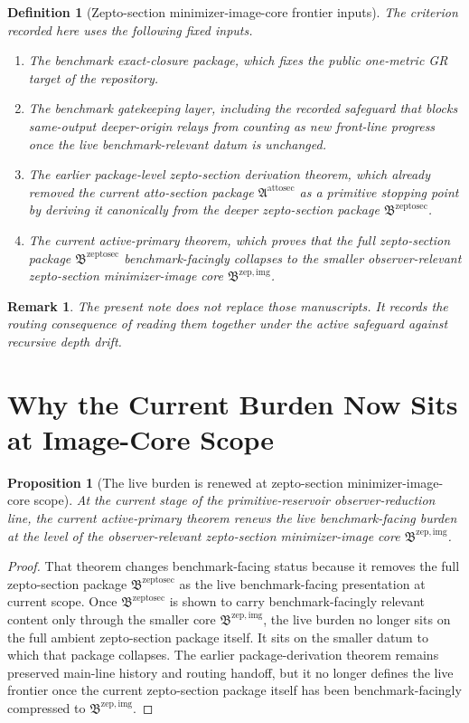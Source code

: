 \documentclass[11pt]{article}
\newcommand{\AttoSectionPackage}{\mathfrak A^{\mathrm{attosec}}}
\newcommand{\ZeptoSectionPackage}{\mathfrak B^{\mathrm{zeptosec}}}
\newcommand{\ZeptoImageCore}{\mathfrak B^{\mathrm{zep,img}}}
\newtheorem{definition}{Definition}
\newtheorem{proposition}{Proposition}
\newtheorem{remark}{Remark}
\begin{document}
\begin{definition}[Zepto-section minimizer-image-core frontier inputs]
The criterion recorded here uses the following fixed inputs.
\begin{enumerate}
    \item The benchmark exact-closure package, which fixes the public one-metric GR target of the repository.
    \item The benchmark gatekeeping layer, including the recorded safeguard that blocks same-output deeper-origin relays from counting as new front-line progress once the live benchmark-relevant datum is unchanged.
    \item The earlier package-level zepto-section derivation theorem, which already removed the current atto-section package \(\AttoSectionPackage\) as a primitive stopping point by deriving it canonically from the deeper zepto-section package \(\ZeptoSectionPackage\).
    \item The current active-primary theorem, which proves that the full zepto-section package \(\ZeptoSectionPackage\) benchmark-facingly collapses to the smaller observer-relevant zepto-section minimizer-image core \(\ZeptoImageCore\).
\end{enumerate}
\end{definition}

\begin{remark}
The present note does not replace those manuscripts. It records the routing consequence of reading them together under the active safeguard against recursive depth drift.
\end{remark}

\section{Why the Current Burden Now Sits at Image-Core Scope}

\begin{proposition}[The live burden is renewed at zepto-section minimizer-image-core scope]
At the current stage of the primitive-reservoir observer-reduction line, the current active-primary theorem renews the live benchmark-facing burden at the level of the observer-relevant zepto-section minimizer-image core \(\ZeptoImageCore\).
\end{proposition}

\begin{proof}
That theorem changes benchmark-facing status because it removes the full zepto-section package \(\ZeptoSectionPackage\) as the live benchmark-facing presentation at current scope. Once \(\ZeptoSectionPackage\) is shown to carry benchmark-facingly relevant content only through the smaller core \(\ZeptoImageCore\), the live burden no longer sits on the full ambient zepto-section package itself. It sits on the smaller datum to which that package collapses. The earlier package-derivation theorem remains preserved main-line history and routing handoff, but it no longer defines the live frontier once the current zepto-section package itself has been benchmark-facingly compressed to \(\ZeptoImageCore\).
\end{proof}
\end{document}
